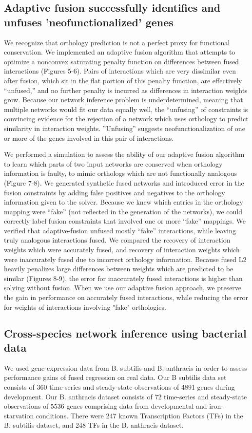 \documentclass[11pt]{article}
\begin{document}
\subsection{Adaptive fusion successfully identifies and unfuses 'neofunctionalized' genes}
We recognize that orthology prediction is not a perfect proxy for functional conservation. We implemented an adaptive fusion algorithm that attempts to optimize a nonconvex saturating penalty function on differences between fused interactions (Figures 5-6). Pairs of interactions which are very dissimilar even after fusion, which sit in the flat portion of this penalty function, are effectively ``unfused,'' and no further penalty is incurred as differences in interaction weights grow. Because our network inference problem is underdetermined, meaning that multiple networks would fit our data equally well, the ``unfusing'' of constraints is convincing evidence for the rejection of a network which uses orthology to predict similarity in interaction weights. ''Unfusing'' suggests neofunctionalization of one or more of the genes involved in this pair of interactions.

We performed a simulation to assess the ability of our adaptive fusion algorithm to learn which parts of two input networks are conserved when orthology information is faulty, to mimic orthologs which are not functionally analogous  (Figure 7-8). We generated synthetic fused networks and introduced error in the fusion constraints by adding false positives and negatives to the orthology information given to the solver. Because we knew which entries in the orthology mapping were ``fake'' (not reflected in the generation of the networks), we could correctly label fusion constraints that involved one or more ``fake'' mappings. We verified that adaptive-fusion unfused mostly ``fake'' interactions, while leaving truly analogous interactions fused. We compared the recovery of interaction weights which were accurately fused, and recovery of interaction weights which were inaccurately fused due to incorrect orthology information. Because fused L2 heavily penalizes large differences between weights which are predicted to be similar (Figures 8-9), the error for inaccurately fused interactions is higher than solving without fusion. When we use our adaptive fusion approach, we preserve the gain in performance on accurately fused interactions, while reducing the error for weights of interactions involving "fake" orthologies. 

\subsection{Cross-species network inference using bacterial data}
We used gene-expression data from B. subtilis and B. anthracis in order to assess performance gains of fused regression on real data. Our B subtilis data set consists of 360 time-series and steady-state observations of 4891 genes during development. Our B. anthracis dataset consists of 72 time-series and steady-state observations of 5536 genes comprising data from developmental and iron-starvation conditions. There were 247 known Transcription Factors (TFs) in the B. subtilis dataset, and 248 TFs in the B. anthracis dataset. 
\end{document}
